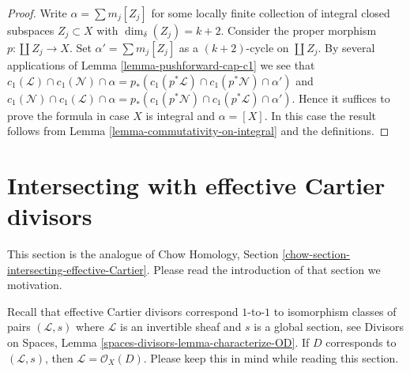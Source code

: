 \documentclass{stacks-project}
\theoremstyle{plain}
\theoremstyle{definition}
\theoremstyle{remark}
\numberwithin{equation}{subsection}
\begin{document}
\begin{proof}
Write $\alpha = \sum m_j[Z_j]$ for some locally finite
collection of integral closed subspaces $Z_j \subset X$
with $\dim_\delta(Z_j) = k + 2$.
Consider the proper morphism $p : \coprod Z_j \to X$.
Set $\alpha' = \sum m_j[Z_j]$ as a $(k + 2)$-cycle on
$\coprod Z_j$. By several applications of
Lemma \ref{lemma-pushforward-cap-c1} we see that
$c_1(\mathcal{L}) \cap c_1(\mathcal{N}) \cap \alpha
= p_*(c_1(p^*\mathcal{L}) \cap c_1(p^*\mathcal{N}) \cap \alpha')$
and
$c_1(\mathcal{N}) \cap c_1(\mathcal{L}) \cap \alpha
= p_*(c_1(p^*\mathcal{N}) \cap c_1(p^*\mathcal{L}) \cap \alpha')$.
Hence it suffices to prove the formula in case $X$ is integral
and $\alpha = [X]$. In this case the result follows
from Lemma \ref{lemma-commutativity-on-integral} and the definitions.
\end{proof}

















\section{Intersecting with effective Cartier divisors}
\label{section-intersecting-effective-Cartier}

\noindent
This section is the analogue of
Chow Homology, Section \ref{chow-section-intersecting-effective-Cartier}.
Please read the introduction of that section we motivation.

\medskip\noindent
Recall that effective Cartier divisors correspond $1$-to-$1$ to
isomorphism classes of pairs $(\mathcal{L}, s)$ where $\mathcal{L}$
is an invertible sheaf and $s$ is a global section, see
Divisors on Spaces, Lemma \ref{spaces-divisors-lemma-characterize-OD}.
If $D$ corresponds to $(\mathcal{L}, s)$, then
$\mathcal{L} = \mathcal{O}_X(D)$. Please keep this in mind while
reading this section.
\end{document}
